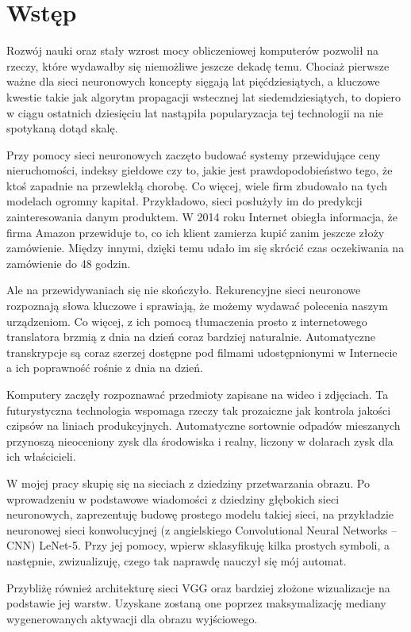 \chapter{Wstęp}
\label{cha:wstep}

Rozwój nauki oraz stały wzrost mocy obliczeniowej komputerów pozwolił na rzeczy, które wydawałby się niemożliwe jeszcze dekadę temu. Chociaż pierwsze ważne dla sieci neuronowych koncepty sięgają lat pięćdziesiątych, a kluczowe kwestie takie jak algorytm propagacji wstecznej lat siedemdziesiątych, to dopiero w ciągu ostatnich dziesięciu lat nastąpiła popularyzacja tej technologii na nie spotykaną dotąd skalę.

Przy pomocy sieci neuronowych zaczęto budować systemy przewidujące ceny nieruchomości, indeksy giełdowe czy to, jakie jest prawdopodobieństwo tego, że ktoś zapadnie na przewlekłą chorobę. Co więcej, wiele firm zbudowało na tych modelach ogromny kapitał. Przykładowo, sieci posłużyły im do predykcji zainteresowania danym produktem. W 2014 roku Internet obiegła informacja, że firma Amazon przewiduje to, co ich klient zamierza kupić zanim jeszcze złoży zamówienie. Między innymi, dzięki temu udało im się skrócić czas oczekiwania na zamówienie do 48 godzin.

Ale na przewidywaniach się nie skończyło. Rekurencyjne sieci neuronowe rozpoznają słowa kluczowe i sprawiają, że możemy wydawać polecenia naszym urządzeniom. Co więcej, z ich pomocą tłumaczenia prosto z internetowego translatora brzmią z dnia na dzień coraz bardziej naturalnie. Automatyczne transkrypcje są coraz szerzej dostępne pod filmami udostępnionymi w Internecie a ich poprawność rośnie z dnia na dzień.

Komputery zaczęły rozpoznawać przedmioty zapisane na wideo i zdjęciach.  Ta futurystyczna technologia wspomaga rzeczy tak prozaiczne jak kontrola jakości czipsów na liniach produkcyjnych. Automatyczne sortownie odpadów mieszanych przynoszą nieoceniony zysk dla środowiska i realny, liczony w dolarach zysk dla ich właścicieli. 

W mojej pracy skupię się na sieciach z dziedziny przetwarzania obrazu. Po wprowadzeniu w podstawowe wiadomości z dziedziny głębokich sieci neuronowych, zaprezentuję budowę prostego modelu takiej sieci, na przykładzie neuronowej sieci konwolucyjnej (z angielskiego Convolutional Neural Networks – CNN) LeNet-5. 
Przy jej pomocy, wpierw sklasyfikuję kilka prostych symboli, a następnie, zwizualizuję, czego tak naprawdę nauczył się mój automat.

Przybliżę również architekturę sieci VGG oraz bardziej złożone wizualizacje na podstawie jej warstw. Uzyskane zostaną one poprzez maksymalizację mediany wygenerowanych aktywacji dla obrazu wyjściowego.

